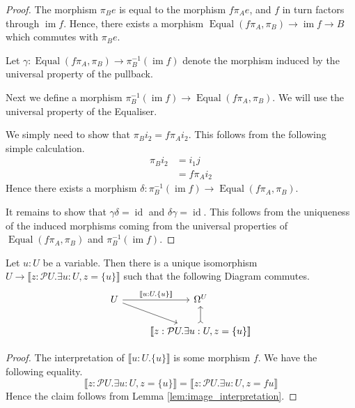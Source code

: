 \documentclass{tac}
\newcommand{\call}[1]{\mathcal{#1}}
\newcommand{\lto}{\longrightarrow}
\begin{document}
\begin{proof}
		The morphism $\pi_B e$ is equal to the morphism $f\pi_Ae$, and $f$ in turn factors through $\operatorname{im}f$. Hence, there exists a morphism $\operatorname{Equal}(f\pi_A,\pi_B) \lto \operatorname{im}f \lto B$ which commutes with $\pi_B e$.
		
		Let $\gamma: \operatorname{Equal}(f\pi_A,\pi_B) \lto \pi_B^{-1}(\operatorname{im}f)$ denote the morphism induced by the universal property of the pullback.
		
		Next we define a morphism $\pi_B^{-1}(\operatorname{im}f) \lto \operatorname{Equal}(f\pi_A,\pi_B)$. We will use the universal property of the Equaliser.
		
		We simply need to show that $\pi_Bi_2 = f\pi_Ai_2$.  This follows from the following simple calculation.
		\begin{align*}
			\pi_B i_2 &= i_1 j\\
			&= f\pi_Ai_2
		\end{align*}
		Hence there exists a morphism $\delta: \pi_B^{-1}(\operatorname{im}f) \lto \operatorname{Equal}(f\pi_A,\pi_B)$.
		
		It remains to show that $\gamma \delta = \operatorname{id}$ and $\delta \gamma = \operatorname{id}$. This follows from the uniqueness of the induced morphisms coming from the universal properties of $\operatorname{Equal}(f\pi_A,\pi_B)$ and $\pi_B^{-1}(\operatorname{im}f)$.
	\end{proof}
	\begin{corollary}\label{cor:embedded_subobject}
		Let $u:U$ be a variable. Then there is a unique isomorphism $U \lto \llbracket z: \call{P}U. \exists u:U, z = \lbrace u \rbrace \rrbracket$ such that the following Diagram commutes.
		\begin{equation}
			\begin{tikzcd}
				U\arrow[r,"{\llbracket u:U. \lbrace u \rbrace \rrbracket}"]\arrow[dr] & \Omega^U\\
				& \llbracket z: \call{P}U . \exists u :U, z = \lbrace u \rbrace \rrbracket\arrow[u,rightarrowtail]
			\end{tikzcd}
		\end{equation}
	\end{corollary}
	\begin{proof}
		The interpretation of $\llbracket u:U. \lbrace u \rbrace \rrbracket$ is some morphism $f$. We have the following equality.
		\begin{equation}
			\llbracket z: \call{P}U. \exists u:U, z = \lbrace u \rbrace \rrbracket = \llbracket z : \call{P}U. \exists u : U, z = fu\rrbracket
		\end{equation}
		Hence the claim follows from Lemma \ref{lem:image_interpretation}.
	\end{proof}
\end{document}
